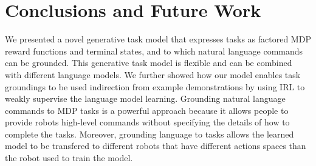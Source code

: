 \documentclass[conference]{IEEEtran}
\begin{document}





\section{Conclusions and Future Work}
We presented a novel generative task model that expresses tasks as factored MDP reward functions and terminal states, and to which natural language commands can be grounded. This generative task model is flexible and can be combined with different language models. We further showed how our model enables task groundings to be used indirection from example demonstrations by using IRL to weakly supervise the language model learning. Grounding natural language commands to MDP tasks is a powerful approach because it allows people to provide robots high-level commands without specifying the details of how to complete the tasks. Moreover, grounding language to tasks allows the learned model to be transfered to different robots that have different actions spaces than the robot used to train the model.
\end{document}
